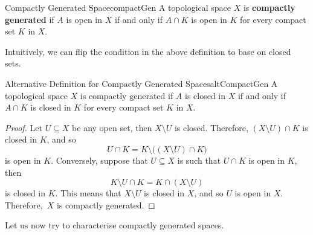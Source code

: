 \documentclass[math]{amznotes}
\theoremstyle{remark}
\begin{document}
\begin{dfnbox}{Compactly Generated Space}{compactGen}
    A topological space $X$ is {\color{red} \textbf{compactly generated}} if $A$ is open in $X$ if and only if $A \cap K$ is open in $K$ for every compact set $K$ in $X$.
\end{dfnbox}
Intuitively, we can flip the condition in the above definition to base on closed sets.
\begin{probox}{Alternative Definition for Compactly Generated Spaces}{altCompactGen}
    A topological space $X$ is compactly generated if $A$ is closed in $X$ if and only if $A \cap K$ is closed in $K$ for every compact set $K$ in $X$.
    \tcblower
    \begin{proof}
        Let $U \subseteq X$ be any open set, then $X \setminus U$ is closed. Therefore, $\left(X \setminus U\right) \cap K$ is closed in $K$, and so 
        \begin{equation*}
            U \cap K = K \setminus \bigl(\left(X \setminus U\right) \cap K\bigr)
        \end{equation*}
        is open in $K$. Conversely, suppose that $U \subseteq X$ is such that $U \cap K$ is open in $K$, then 
        \begin{equation*}
            K \setminus U \cap K = K \cap \left(X \setminus U\right)
        \end{equation*}
        is closed in $K$. This means that $X \setminus U$ is closed in $X$, and so $U$ is open in $X$. Therefore,~$X$ is compactly generated.
    \end{proof}
\end{probox}
Let us now try to characterise compactly generated spaces.
\end{document}
